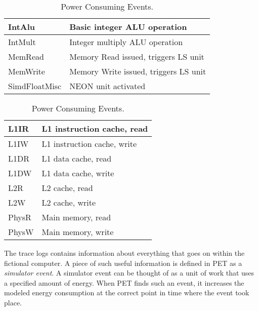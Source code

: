 \begin{table}[ht]
    \centering
    \begin{minipage}[b]{\linewidth}
        \centering
        \begin{tabular}{|l|l|}
            \hline
            IntAlu      & Basic integer ALU operation\\
            \hline
            IntMult     & Integer multiply ALU operation \\
            \hline
            MemRead     & Memory Read issued, triggers LS unit \\
            \hline
            MemWrite    & Memory Write issued, triggers LS unit \\
            \hline
            SimdFloatMisc     & NEON unit activated \\
            \hline
        \end{tabular}
    \end{minipage}

    \begin{minipage}[b]{\linewidth}
        \centering
        \begin{tabular}{|l|l|}
            \hline
            L1IR    & L1 instruction cache, read \\
            \hline
            L1IW    & L1 instruction cache, write \\
            \hline
            L1DR    & L1 data cache, read \\
            \hline
            L1DW    & L1 data cache, write \\
            \hline
            L2R     & L2 cache, read \\
            \hline
            L2W     & L2 cache, write \\
            \hline
            PhysR   & Main memory, read \\
            \hline
            PhysW   & Main memory, write \\
            \hline
        \end{tabular}
    \end{minipage}
    \caption{Power Consuming Events.}
    \label{tbl:events}
\end{table}

The trace logs contains information about everything that goes on within the
fictional computer. A piece of such useful information is defined in PET as a
\emph{simulator event}. A simulator event can be thought of as a unit of work
that uses a specified amount of energy. When PET finds such an event, it
increases the modeled energy consumption at the correct point in time where the
event took place.

